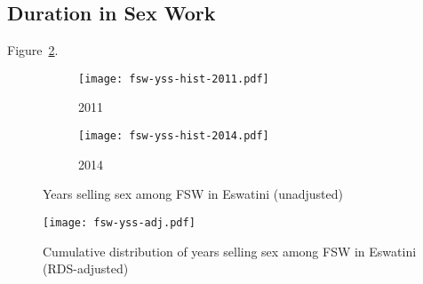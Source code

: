 \subsection{Duration in Sex Work}\label{app.model.fsw.dur}
Figure~\ref{fig:fsw.yss.adj}.
\begin{figure}
  \begin{subfigure}{0.5\linewidth}
    \texttt{[image: fsw-yss-hist-2011.pdf]}
    \caption{2011 \cite{Baral2014}}
  \end{subfigure}%
  \begin{subfigure}{0.5\linewidth}
    \texttt{[image: fsw-yss-hist-2014.pdf]}
    \caption{2014 \cite{EswKP2014}}
  \end{subfigure}
  \caption{Years selling sex among FSW in Eswatini (unadjusted)}
  \label{fig:fsw.yss.raw}
\end{figure}
\begin{figure}
  \centering
  \texttt{[image: fsw-yss-adj.pdf]}
  \caption{Cumulative distribution of years selling sex among FSW in Eswatini (RDS-adjusted)}
  \label{fig:fsw.yss.adj}
\end{figure}
\clearpage %